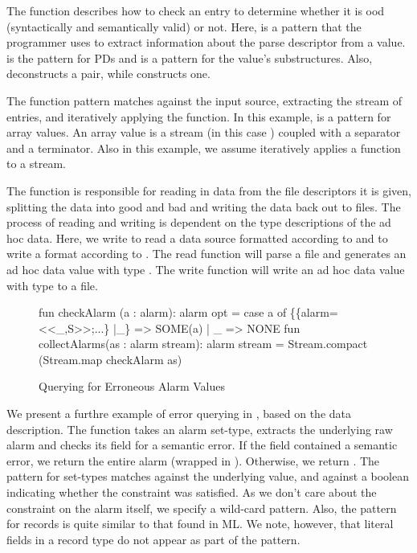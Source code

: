 The  function describes how to check an entry to
determine whether it is ood (syntactically and semantically
valid) or not.  Here,  is a pattern that the
programmer uses to extract information about the parse descriptor from
a value.   is the pattern for PDs and  is a pattern
for the value's substructures. Also,  deconstructs a pair,
while  constructs one.

The  function pattern matches against the input
source, extracting the stream of entries, and iteratively applying the
 function.  In this example, 
is a pattern for array values.  An array value is a stream (in this
case ) coupled with a separator and a terminator.  Also in
this example, we assume  iteratively applies a
function to a stream.  

The function  is responsible for reading in data from the file
descriptors it is given, splitting the data into good and bad and
writing the data back out to files.  The process of reading and
writing is dependent on the type descriptions of the ad hoc data.
Here, we write  to read a data source formatted according
to  and  to write a format according to .
The read function will parse a file and generates an ad hoc data value
with type .  The write function will write an ad hoc data value
with type  to a file.

\begin{figure}
  \centering
\begin{code}
fun checkAlarm (a : alarm): alarm opt =
    case a of 
	\{\{alarm=<<_,S>>;...\} |_\} => SOME(a)
      | _ => NONE
\mbox{}
fun collectAlarms(as : alarm stream): alarm stream =
    Stream.compact (Stream.map checkAlarm as)  
\end{code}
  \caption{Querying for Erroneous Alarm Values}
  \label{fig:ex-error-query}
\end{figure}

We present a furthre example of error querying in
, based on the \darkstar{} data
description. The function  takes an alarm set-type,
extracts the underlying raw alarm and checks its  field for
a semantic error.  If the  field contained a semantic error,
we return the entire alarm (wrapped in ). Otherwise, we
return . The pattern  for set-types
matches  against the underlying value, and  against
a boolean indicating whether the constraint was satisfied. As we don't
care about the constraint on the alarm itself, we specify a wild-card
pattern.  Also, the pattern for records is quite similar to that found
in ML. We note, however, that literal fields in a record type do not
appear as part of the pattern. 

